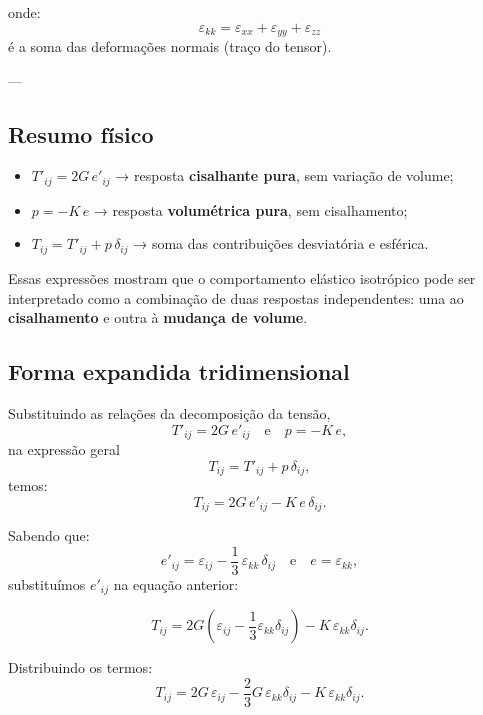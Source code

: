 onde:
\[
\varepsilon_{kk} = \varepsilon_{xx} + \varepsilon_{yy} + \varepsilon_{zz}
\]
é a soma das deformações normais (traço do tensor).

---

\subsection*{Resumo físico}

\begin{itemize}
    \item $T'_{ij} = 2G\,e'_{ij}$ → resposta \textbf{cisalhante pura}, sem variação de volume;
    \item $p = -K\,e$ → resposta \textbf{volumétrica pura}, sem cisalhamento;
    \item $T_{ij} = T'_{ij} + p\,\delta_{ij}$ → soma das contribuições desviatória e esférica.
\end{itemize}

Essas expressões mostram que o comportamento elástico isotrópico pode ser interpretado como a combinação de duas respostas independentes: uma ao \textbf{cisalhamento} e outra à \textbf{mudança de volume}.



\subsection{Forma expandida tridimensional}

Substituindo as relações da decomposição da tensão,
\[
T'_{ij} = 2G\,e'_{ij}
\quad \text{e} \quad
p = -K\,e,
\]
na expressão geral
\[
T_{ij} = T'_{ij} + p\,\delta_{ij},
\]
temos:
\[
T_{ij} = 2G\,e'_{ij} - K\,e\,\delta_{ij}.
\]

Sabendo que:
\[
e'_{ij} = \varepsilon_{ij} - \frac{1}{3}\,\varepsilon_{kk}\,\delta_{ij}
\quad \text{e} \quad
e = \varepsilon_{kk},
\]
substituímos $e'_{ij}$ na equação anterior:

\[
T_{ij} = 2G\left(\varepsilon_{ij} - \frac{1}{3}\varepsilon_{kk}\delta_{ij}\right) - K\,\varepsilon_{kk}\delta_{ij}.
\]

Distribuindo os termos:
\[
T_{ij} = 2G\,\varepsilon_{ij} - \frac{2}{3}G\,\varepsilon_{kk}\delta_{ij} - K\,\varepsilon_{kk}\delta_{ij}.
\]

